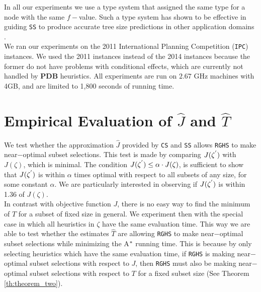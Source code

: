 In all our experiments we use a type system that assigned the same type for a node with the same $f-$value. Such a type system has shown to be effective in guiding \texttt{SS} to produce accurate tree size predictions in other application domains \cite{lelis2013predicting,lelis2014memory}.\\

We ran our experiments on the 2011 International Planning Competition (\texttt{IPC}) instances. We used the 2011 instances instead of the 2014 instances because the former do not have problems with conditional effects, which are currently not handled by \textbf{PDB} heuristics. All experiments are run on $2.67$ GHz machines with 4GB, and are limited to 1,800 seconds of running time.\\

\section{Empirical Evaluation of $\hat{J}$ and $\hat{T}$}
\noindent
We test whether the approximation $\hat{J}$ provided by \texttt{CS} and \texttt{SS} allows \texttt{RGHS} to make near$-$optimal subset selections. This test is made by comparing $J(\zeta\sp{'})$ with $J(\zeta)$, which is minimal. The condition $J(\zeta\sp{'}) \leq \alpha \cdot J(\zeta)$, is sufficient to show that $J(\zeta\sp{'})$ is within $\alpha$ times optimal with respect to all subsets of any size, for some constant $\alpha$. We are particularly interested in observing if $J(\zeta\sp{'})$ is within 1.36 of $J(\zeta)$.\\

In contrast with objective function $J$, there is no easy way to find the minimum of $T$ for a subset of fixed size in general. We experiment then with the special case in which all heuristics in $\zeta$ have the same evaluation time. This way we are able to test whether the estimates $\hat{T}$ are allowing \texttt{RGHS} to make near$-$optimal subset selections while minimizing the A$\sp{*}$ running time. This is because by only selecting heuristics which have the same evaluation time, if \texttt{RGHS} is making near$-$optimal subset selections with respect to $J$, then \texttt{RGHS} must also be making near$-$optimal subset selections with respect to $T$ for a fixed subset size (See Theorem \ref{th:theorem_two}).\\

